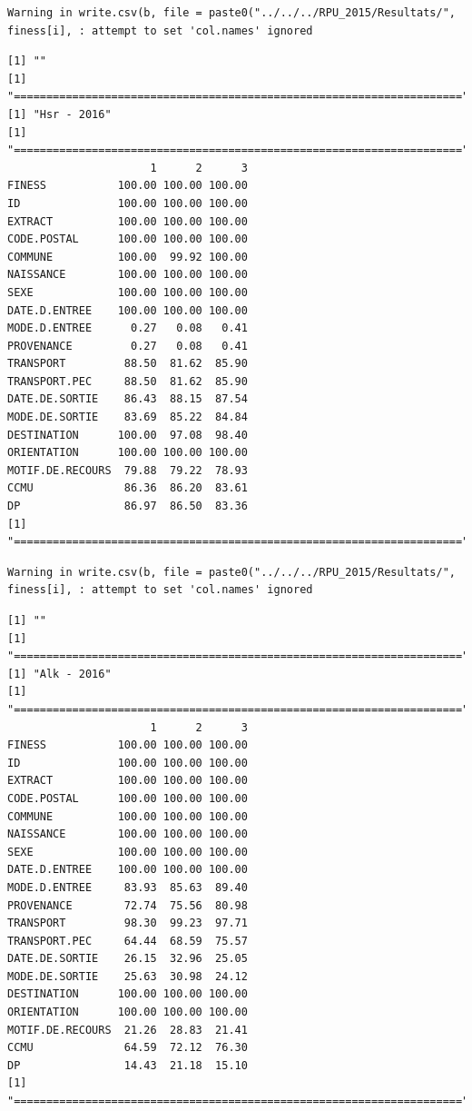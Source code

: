 \documentclass[]{article}
\begin{document}
\begin{verbatim}
Warning in write.csv(b, file = paste0("../../../RPU_2015/Resultats/",
finess[i], : attempt to set 'col.names' ignored
\end{verbatim}

\begin{verbatim}
[1] ""
[1] "====================================================================="
[1] "Hsr - 2016"
[1] "====================================================================="
                      1      2      3
FINESS           100.00 100.00 100.00
ID               100.00 100.00 100.00
EXTRACT          100.00 100.00 100.00
CODE.POSTAL      100.00 100.00 100.00
COMMUNE          100.00  99.92 100.00
NAISSANCE        100.00 100.00 100.00
SEXE             100.00 100.00 100.00
DATE.D.ENTREE    100.00 100.00 100.00
MODE.D.ENTREE      0.27   0.08   0.41
PROVENANCE         0.27   0.08   0.41
TRANSPORT         88.50  81.62  85.90
TRANSPORT.PEC     88.50  81.62  85.90
DATE.DE.SORTIE    86.43  88.15  87.54
MODE.DE.SORTIE    83.69  85.22  84.84
DESTINATION      100.00  97.08  98.40
ORIENTATION      100.00 100.00 100.00
MOTIF.DE.RECOURS  79.88  79.22  78.93
CCMU              86.36  86.20  83.61
DP                86.97  86.50  83.36
[1] "====================================================================="
\end{verbatim}

\begin{verbatim}
Warning in write.csv(b, file = paste0("../../../RPU_2015/Resultats/",
finess[i], : attempt to set 'col.names' ignored
\end{verbatim}

\begin{verbatim}
[1] ""
[1] "====================================================================="
[1] "Alk - 2016"
[1] "====================================================================="
                      1      2      3
FINESS           100.00 100.00 100.00
ID               100.00 100.00 100.00
EXTRACT          100.00 100.00 100.00
CODE.POSTAL      100.00 100.00 100.00
COMMUNE          100.00 100.00 100.00
NAISSANCE        100.00 100.00 100.00
SEXE             100.00 100.00 100.00
DATE.D.ENTREE    100.00 100.00 100.00
MODE.D.ENTREE     83.93  85.63  89.40
PROVENANCE        72.74  75.56  80.98
TRANSPORT         98.30  99.23  97.71
TRANSPORT.PEC     64.44  68.59  75.57
DATE.DE.SORTIE    26.15  32.96  25.05
MODE.DE.SORTIE    25.63  30.98  24.12
DESTINATION      100.00 100.00 100.00
ORIENTATION      100.00 100.00 100.00
MOTIF.DE.RECOURS  21.26  28.83  21.41
CCMU              64.59  72.12  76.30
DP                14.43  21.18  15.10
[1] "====================================================================="
\end{verbatim}
\end{document}
